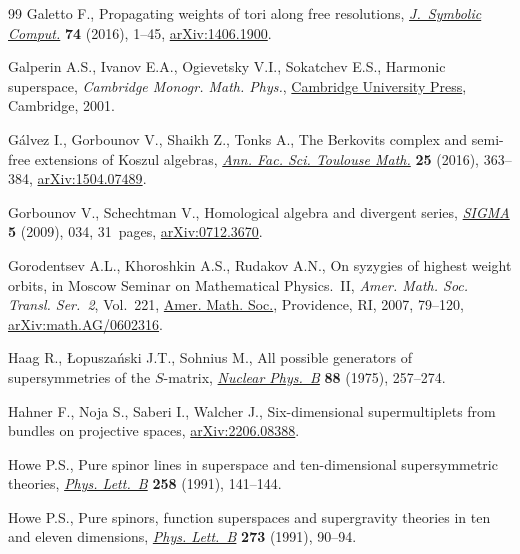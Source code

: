 \documentclass[pdftex]{sigma}
\numberwithin{equation}{section}
\begin{document}
\begin{thebibliography}{99}
Galetto F., Propagating weights of tori along free resolutions,
 \href{https://doi.org/10.1016/j.jsc.2015.05.004}{\textit{J.~Symbolic Comput.}} \textbf{74} (2016), 1--45, \href{https://arxiv.org/abs/1406.1900}{arXiv:1406.1900}.

Galperin A.S., Ivanov E.A., Ogievetsky V.I., Sokatchev E.S., Harmonic
 superspace, \textit{Cambridge Monogr. Math. Phys.}, \href{https://doi.org/10.1017/CBO9780511535109}{Cambridge University Press},
 Cambridge, 2001.

G\'alvez I., Gorbounov V., Shaikh Z., Tonks A., The {B}erkovits complex and
 semi-free extensions of {K}oszul algebras, \href{https://doi.org/10.5802/afst.1497}{\textit{Ann. Fac. Sci. Toulouse
 Math.}} \textbf{25} (2016), 363--384, \href{https://arxiv.org/abs/1504.07489}{arXiv:1504.07489}.

Gorbounov V., Schechtman V., Homological algebra and divergent series,
 \href{https://doi.org/10.3842/SIGMA.2009.034}{\textit{SIGMA}} \textbf{5} (2009), 034, 31~pages, \href{https://arxiv.org/abs/0712.3670}{arXiv:0712.3670}.

Gorodentsev A.L., Khoroshkin A.S., Rudakov A.N., On syzygies of highest weight
 orbits, in Moscow {S}eminar on {M}athematical {P}hysics.~{II}, \textit{Amer.
 Math. Soc. Transl. Ser.~2}, Vol.~221, \href{https://doi.org/10.1090/trans2/221/05}{Amer. Math. Soc.}, Providence, RI, 2007,
 79--120, \href{https://arxiv.org/abs/math.AG/0602316}{arXiv:math.AG/0602316}.

Haag R., {\L}opusza\'nski J.T., Sohnius M., All possible generators of
 supersymmetries of the {$S$}-matrix, \href{https://doi.org/10.1016/0550-3213(75)90279-5}{\textit{Nuclear Phys.~B}} \textbf{88}
 (1975), 257--274.

Hahner F., Noja S., Saberi I., Walcher J., Six-dimensional supermultiplets from
 bundles on projective spaces, \href{https://arxiv.org/abs/2206.08388}{arXiv:2206.08388}.

Howe P.S., Pure spinor lines in superspace and ten-dimensional supersymmetric
 theories, \href{https://doi.org/10.1016/0370-2693(91)91221-G}{\textit{Phys. Lett.~B}} \textbf{258} (1991), 141--144.

Howe P.S., Pure spinors, function superspaces and supergravity theories in ten
 and eleven dimensions, \href{https://doi.org/10.1016/0370-2693(91)90558-8}{\textit{Phys. Lett.~B}} \textbf{273} (1991), 90--94.


\end{thebibliography}
\end{document}
